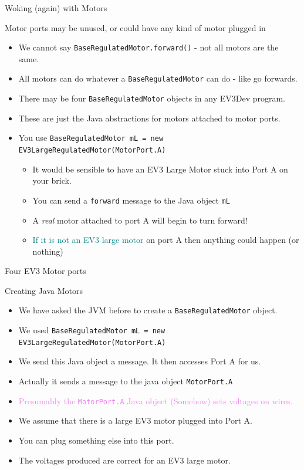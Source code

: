 \documentclass[color=pdftex,usenames,dvipsnames, aspectratio=169]{beamer}
\begin{document}
\begin{frame}{Woking (again) with Motors}
\begin{block}{Motor ports may be unused, or could have any kind of motor plugged in}
\begin{itemize}
\item We cannot say \lstinline!BaseRegulatedMotor.forward()! - not all motors are the same.
\item All motors can do whatever a \lstinline!BaseRegulatedMotor! can do - like go forwards.
\item There may be four \lstinline!BaseRegulatedMotor! objects in any EV3Dev program.
\item These are just the Java abstractions for motors attached to motor ports.
\item You use {\lstinline[basicstyle=\ttfamily\color{blue}\small]!BaseRegulatedMotor mL = new EV3LargeRegulatedMotor(MotorPort.A)!}
\begin{itemize} 
  \item \textcolor{BrickRed}{It would be sensible to have an EV3 Large Motor stuck into Port A on your brick.}
\item You can send a \lstinline!forward! message to the Java object \lstinline!mL!
\item A \emph{real} motor attached to port A will begin to turn forward!
\item \textcolor{teal}{If it is not an EV3 large motor} on port A then anything could happen (or nothing)
\end{itemize}
\end{itemize}
\end{block}
\end{frame}

\begin{frame}{Four EV3 Motor ports}
\begin{block}{Creating Java Motors}
\begin{itemize}
  \item We have asked the JVM before to create a \lstinline!BaseRegulatedMotor! object.
  \item We used \lstinline[basicstyle=\ttfamily\color{blue}\small]!BaseRegulatedMotor mL = new EV3LargeRegulatedMotor(MotorPort.A)!
\item \textcolor{RedOrange}{We send this Java object a message.  It then accesses Port A for us.}
\item \textcolor{OliveGreen}{Actually it sends a message to the java object \lstinline!MotorPort.A!}
\item \textcolor{violet}{Presumably the  \lstinline!MotorPort.A! Java object (Somehow) sets voltages on wires.}
\item We assume that there is a large EV3 motor plugged into Port A.
\item \alert{You can plug something else into this port.}
\item  The voltages produced are correct for an EV3 large motor.
\end{itemize}
\end{block}
\end{frame}
\end{document}
